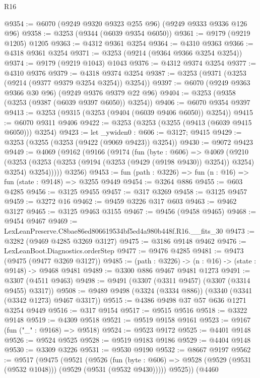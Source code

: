 \begin{lexlean}{R16}
\begin{coremodule}
@9354 := @6070 (@9249 @9320 @9323 @255 @96) (@9249 @9333 @9336 @126 @96)
@9358 := @3253 (@9344 (@6039 @9354 @6050))
@9361 := @9179 (@9219 @1205) @1205
@9363 := @4312 @9361 @3254
@9364 := @4310 @9363
@9366 := @4318 @9361 @3254
@9371 := @3253 (@9214 (@9364 @9366 @3254 @3254))
@9374 := @9179 (@9219 @1043) @1043
@9376 := @4312 @9374 @3254
@9377 := @4310 @9376
@9379 := @4318 @9374 @3254
@9387 := @3253 (@9371 (@3253 (@9214 (@9377 @9379 @3254 @3254)) @3254))
@9397 := @6070 (@9249 @9363 @9366 @30 @96) (@9249 @9376 @9379 @22 @96)
@9404 := @3253 (@9358 (@3253 (@9387 (@6039 @9397 @6050)) @3254))
@9406 := @6070 @9354 @9397
@9413 := @3253 (@9315 (@3253 (@9404 (@6039 @9406 @6050)) @3254))
@9415 := @6070 @9311 @9406
@9422 := @3253 (@3253 (@3255 (@9413 (@6039 @9415 @6050))) @3254)
@9423 := let _ywiden0 : @606 := @3127; @9415
@9429 := @3253 (@3255 (@3253 (@9422 (@9069 @9423)) @3254))
@9430 := @9072 @9423
@9449 := @4069
    (@9162
      (@9166
        (@9174
          (fun (byte : @606) =>
          @4069
            (@9210
              (@3253
                (@3253 (@3253 (@9194 (@3253 (@9429 (@9198 @9430)) @3254)) @3254) @3254)
                @3254)))))
      @3256)
@9453 := fun (path : @3226) => fun (n : @16) => fun (state : @9148) => @3255 @9449
@9454 := @3264 @886
@9455 := @603 @4285
@9456 := @3125 @9455
@9457 := @317 @3269
@9458 := @3125 @9457
@9459 := @3272 @16
@9462 := @9459 @3226 @317 @603
@9463 := @9462 @3127
@9465 := @3125 @9463 @3155
@9467 := @9456 (@9458 @9465)
@9468 := @9454 @9467
@9469 := LexLeanPreserve.C8bae86ed806619534bf5ed4a980b448f.R16.__fits_30
@9473 := @3282 (@9469 @4285 @3269 @3127)
@9475 := @3186 @9148 @9462
@9476 := LexLeanBoot.Diagnostics.orderStep
@9477 := @9476 @4285
@9481 := @9473 (@9475 (@9477 @3269 @3127))
@9485 := (path : @3226) -> (n : @16) -> (state : @9148) -> @9468 @9481
@9489 := @3300 @886 @9467 @9481 @1273
@9491 := @3307 (@4511 @9463)
@9498 := @9491 (@3307 (@3311 @9457) (@3307 (@3314 @9455) @3317))
@9508 := @9489 @9498 (@3324 (@3334 @886)) (@3340 (@3341 (@3342 @1273) @9467 @3317))
@9515 := @4386 @9498 @37 @57 @636 @1271 @3254 @9449
@9516 := @317 @9154
@9517 := @9515 @9516
@9518 := @3322 @9148
@9519 := @4309 @9518
@9521 := @9519 @9158 @9161
@9523 := @9167 (fun ("_" : @9168) => @9518)
@9524 := @9523 @9172
@9525 := @4401 @9148
@9526 := @9524 @9525
@9528 := @9519 @9183 @9186
@9529 := @4404 @9148
@9530 := @3309 @3226
@9531 := @9530 @9190
@9532 := @8667 @9197
@9562 := @9517
    (@9475
      (@9521
        (@9526
          (fun (byte : @606) => @9528 (@9529 (@9531 (@9532 @1048))) (@9529 (@9531 (@9532 @9430)))))
        @9525))
    (@4460

\end{coremodule}
\end{lexlean}
